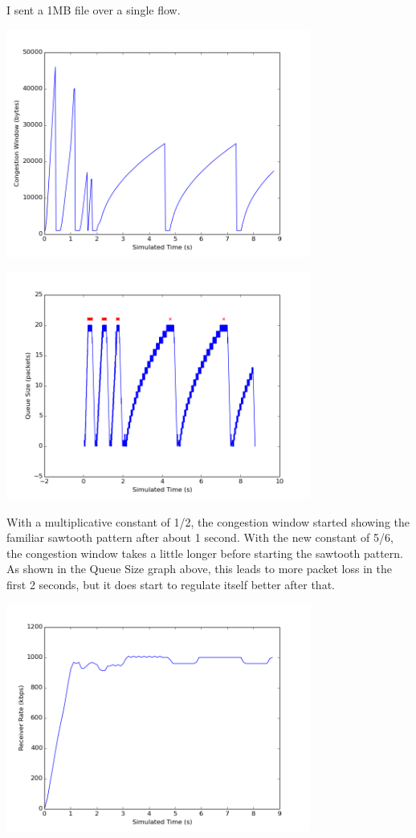 \documentclass[11pt]{article}
\begin{document}
I sent a 1MB file over a single flow.

\includegraphics[width=10cm]{../graphs/aimdconst_cwnd.png}

\includegraphics[width=10cm]{../graphs/aimdconst_queue_size.png}

With a multiplicative constant of 1/2, the congestion window started showing the familiar sawtooth pattern after about 1 second. With the new constant of 5/6, the congestion window takes a little longer before starting the sawtooth pattern. As shown in the Queue Size graph above, this leads to more packet loss in the first 2 seconds, but it does start to regulate itself better after that.

\includegraphics[width=10cm]{../graphs/aimdconst_receiver_rate.png}
\end{document}
